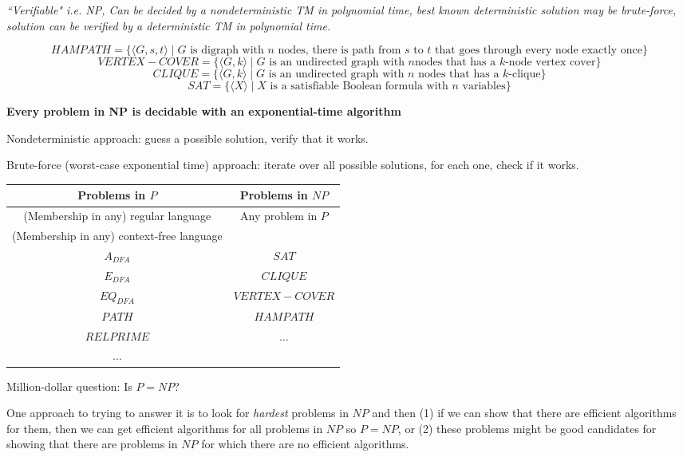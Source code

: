 \documentclass[12pt, oneside]{article}
\begin{document}
{\it ``Verifiable" i.e. NP, Can be decided by a nondeterministic TM in polynomial time,
best known deterministic solution may be brute-force, 
solution can be verified by a deterministic TM in polynomial time.}

\[
    HAMPATH = \{\langle G,s,t \rangle \mid \textrm{$G$ is digraph with $n$ nodes, there is path
from $s$ to $t$ that goes through every node exactly once}\}
\]
\[
    VERTEX-COVER = \{ \langle G,k\rangle \mid \textrm{$G$ is an undirected graph with $n$
nodes that has a $k$-node vertex cover}\}
\]
\[
    CLIQUE = \{ \langle G,k\rangle \mid \textrm{$G$ is an undirected graph with $n$ nodes that has a $k$-clique}\}
\]
\[
    SAT =\{ \langle X \rangle \mid \textrm{$X$ is a satisfiable Boolean formula with $n$ variables}\}
\]

\vfill
\newpage
{\bf Every problem in NP is decidable with an exponential-time algorithm}

Nondeterministic approach: guess a possible solution, verify that it works.

Brute-force (worst-case exponential time) approach: iterate over all possible solutions, for each 
one, check if it works.



\begin{center}
\begin{tabular}{c|c}
    {\bf Problems in $P$} & {\bf Problems in $NP$}\\
    \hline
    (Membership in any) regular language & Any problem in $P$ \\
    (Membership in any) context-free language &  \\
    $A_{DFA}$ & $SAT$\\
    $E_{DFA}$ & $CLIQUE$ \\
    $EQ_{DFA}$ & $VERTEX-COVER$ \\
    $PATH$ & $HAMPATH$ \\
    $RELPRIME$ &  $\ldots$ \\
$\ldots$ &\\
\end{tabular}
\end{center}

Million-dollar question: Is $P = NP$?


One approach to trying to answer it is to look for {\it hardest} problems in $NP$ and 
then (1) if we can show that there are efficient algorithms for them, then we can get 
efficient algorithms for all problems in $NP$ so $P = NP$, or (2) these problems might 
be good candidates for showing that there are problems in $NP$ for which there 
are no efficient algorithms.
\end{document}

